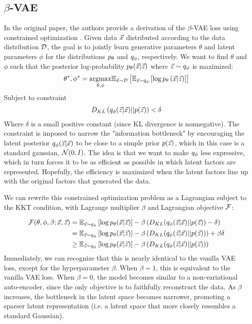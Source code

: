 \subsection{$\beta$-VAE}

In the original paper, the authors provide a derivation of the $\beta$-VAE loss using constrained optimization \cite{higgins2016beta}. Given data $\vec{x}$ distributed according to the data distribution $\mathcal{D}$, the goal is to jointly learn generative parameters $\theta$ and latent parameters $\phi$ for the distributions $p_\theta$ and $q_\phi$, respectively. We want to find $\theta$ and $\phi$ such that the posterior log-probability $p_\theta(\vec{x}|\vec{z})$ where $\vec{z}\sim q_\phi$ is maximized:
\begin{align*}
    \theta^*,\phi^* = \underset{\theta,\phi}{\operatorname{argmax}}\mathbb{E}_{\vec{x}\sim\mathcal{D}}\left[ \mathbb{E}_{\vec{z}\sim q_\phi}\left[ \log p_\theta\left( \vec{x}|\vec{z} \right) \right] \right]
\end{align*}
Subject to constraint
\begin{align*}
    D_{KL}\left( q_\phi(\vec{z}|\vec{x})||p(\vec{z}) \right) < \delta
\end{align*}
Where $\delta$ is a small positive constant (since KL divergence is nonnegative). The constraint is imposed to narrow the "information bottleneck" by encouraging the latent posterior $q_\phi(\vec{z}|\vec{x})$ to be close to a simple prior $p(\vec{z})$, which in this case is a standard gaussian, $\mathcal{N}(0, I)$. The idea is that we want to make $q_\phi$ less expressive, which in turn forces it to be as efficient as possible in which latent factors are represented. Hopefully, the efficiency is maximized when the latent factors line up with the original factors that generated the data.

We can rewrite this constrained optimization problem as a Lagrangian subject to the KKT condition, with Lagrange multiplier $\beta$ and Lagrangian objective $\mathcal{F}$:

\begin{align*}
    \mathcal{F}(\theta, \phi, \beta; \vec{x}, \vec{z}) &= \mathbb{E}_{\vec{z}\sim q_\phi}\left[ \log p_\theta(\vec{x}|\vec{z}) \right] - \beta\left( D_{KL}(q_\phi(\vec{z}|\vec{x})||p(\vec{z})) - \delta \right) \\
    &= \mathbb{E}_{\vec{z}\sim q_\phi}\left[ \log p_\theta(\vec{x}|\vec{z}) \right] - \beta\left( D_{KL}(q_\phi(\vec{z}|\vec{x})||p(\vec{z}))\right) + \beta\delta \\
    &\geq \mathbb{E}_{\vec{z}\sim q_\phi}\left[ \log p_\theta(\vec{x}|\vec{z}) \right] - \beta\left( D_{KL}(q_\phi(\vec{z}|\vec{x})||p(\vec{z}))\right)
\end{align*}
Immediately, we can recognize that this is nearly identical to the vanilla VAE loss, except for the hyperparameter $\beta$. When $\beta=1$, this is equivalent to the vanilla VAE loss. When $\beta = 0$, the model becomes similar to a non-variational auto-encoder, since the only objective is to faithfully reconstruct the data. As $\beta$ increases, the bottleneck in the latent space becomes narrower, promoting a sparser latent representation (i.e. a latent space that more closely resembles a standard Gaussian).

